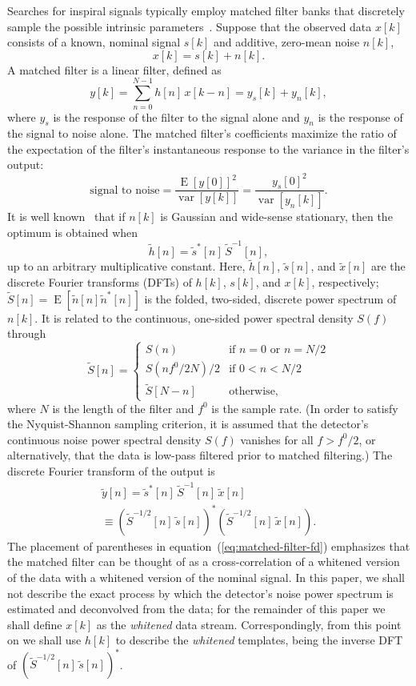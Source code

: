 \documentclass[preprint2]{aastex}
\DeclareMathOperator{\expectation}{E}
\DeclareMathOperator{\var}{var}
\begin{document}
Searches for inspiral signals typically employ matched filter
banks that discretely sample the possible intrinsic parameters~\citep{findchirppaper}.  Suppose that the observed data $x[k]$ consists of a known, nominal signal $s[k]$ and additive, zero-mean noise $n[k]$,
%
$$
	x[k] = s[k] + n[k].
$$
%
A matched filter is a linear filter, defined as
%
$$
	y[k] = \sum_{n=0}^{N-1} h[n] \, x[k-n] = y_s[k] + y_n[k],
$$
%
where $y_s$ is the response of the filter to the signal alone and $y_n$ is the response of the signal to noise alone.  The matched filter's coefficients maximize the ratio of the expectation of the filter's instantaneous response to the variance in the filter's output:
%
$$
\textrm{signal to noise} = \frac{\expectation \left[ y[0] \right]^2}{\var \left[ y[k] \right]} = \frac{y_s[0]^2}{\var \left[ y_n[k] \right]}.
$$
%
It is well known~\citep[see, for example,][]{matched-filter} that if $n[k]$ is Gaussian and wide-sense stationary, then the optimum is obtained when
%
$$
\tilde{h}[n] = \tilde{s}^*[n] \, \tilde{S}^{-1}[n],
$$
%
up to an arbitrary multiplicative constant.  Here, $\tilde{h}[n]$, $\tilde{s}[n]$, and $\tilde{x}[n]$ are the discrete Fourier transforms (DFTs) of $h[k]$, $s[k]$, and $x[k]$, respectively; $\tilde{S}[n] = \expectation \left[ \tilde{n}[n] \tilde{n}^* [n] \right]$ is the folded, two-sided, discrete power spectrum of $n[k]$.  It is related to the continuous, one-sided power spectral density $S(f)$ through
$$
	\tilde{S}[n] =
	\begin{cases}
		S(n) & \textrm{if } n = 0 \textrm{ or } n = N / 2 \\
		S(n f^0 / 2 N) / 2 & \textrm{if } 0 < n < N / 2 \\
		\tilde{S}[N - n] & \textrm{otherwise},
	\end{cases}
$$
where $N$ is the length of the filter and $f^0$ is the sample rate.  (In order to satisfy the Nyquist-Shannon sampling criterion, it is assumed that the detector's continuous noise power spectral density $S(f)$ vanishes for all $f > f^0 / 2$, or alternatively, that the data is low-pass filtered prior to matched filtering.)  The discrete Fourier transform of the output is
%
\begin{multline}
\label{eq:matched-filter-fd}
\tilde{y}[n] = \tilde{s}^*[n] \, \tilde{S}^{-1}[n] \, \tilde{x}[n] \\
\equiv \left(\tilde{S}^{-1/2}[n] \, \tilde{s}[n]\right)^* \left(\tilde{S}^{-1/2}[n] \, \tilde{x}[n] \right).
\end{multline}
%
The placement of parentheses in equation~(\ref{eq:matched-filter-fd}) emphasizes that the matched filter can be thought of as a cross-correlation of a whitened version of the data with a whitened version of the nominal signal.  In this paper, we shall not describe the exact process by which the detector's noise power spectrum is estimated and deconvolved from the data; for the remainder of this paper we shall define $x[k]$ as the \emph{whitened} data stream.  Correspondingly, from this point on we shall use $h[k]$ to describe the \emph{whitened} templates, being the inverse DFT of $\left(\tilde{S}^{-1/2}[n] \, \tilde{s}[n]\right)^*$.
\end{document}
